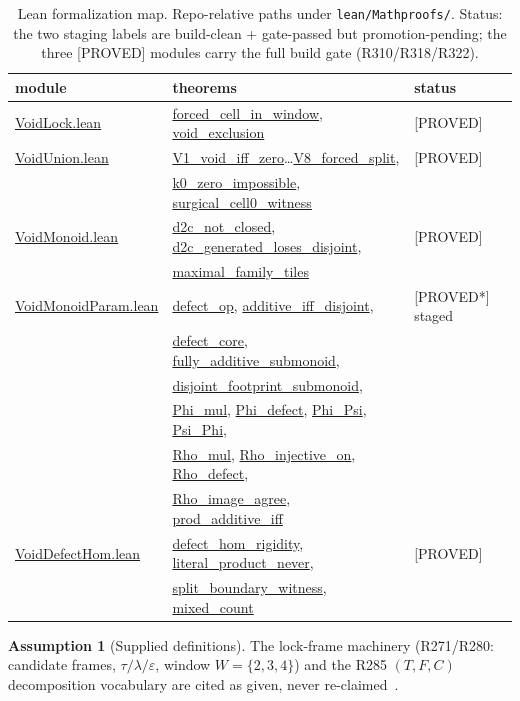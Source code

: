 \documentclass[11pt,a4paper]{article}
\theoremstyle{definition}
\newtheorem{assumption}{Assumption}
\begin{document}
\begin{table}[t]
  \centering
  \caption{Lean formalization map. Repo-relative paths under
    \texttt{lean/Mathproofs/}. Status: the two staging labels are
    build-clean + gate-passed but promotion-pending; the three
    [PROVED] modules carry the full build gate (R310/R318/R322).}
  \label{tab:formal}
  \begin{tabular}{lll}
    \toprule
    module & theorems & status \\
    \midrule
    \url{VoidLock.lean} &
    \url{forced_cell_in_window}, \url{void_exclusion} &
    [PROVED] \\
    \url{VoidUnion.lean} &
    \url{V1_void_iff_zero}\ldots\url{V8_forced_split}, &
    [PROVED] \\
    & \url{k0_zero_impossible}, \url{surgical_cell0_witness} & \\
    \url{VoidMonoid.lean} &
    \url{d2c_not_closed}, \url{d2c_generated_loses_disjoint}, &
    [PROVED] \\
    & \url{maximal_family_tiles} & \\
    \url{VoidMonoidParam.lean} &
    \url{defect_op}, \url{additive_iff_disjoint}, &
    [PROVED*] staged \\
    & \url{defect_core}, \url{fully_additive_submonoid}, & \\
    & \url{disjoint_footprint_submonoid}, & \\
    & \url{Phi_mul}, \url{Phi_defect}, \url{Phi_Psi},
      \url{Psi_Phi}, & \\
    & \url{Rho_mul}, \url{Rho_injective_on},
      \url{Rho_defect}, & \\
    & \url{Rho_image_agree}, \url{prod_additive_iff} & \\
    \url{VoidDefectHom.lean} &
    \url{defect_hom_rigidity}, \url{literal_product_never}, &
    [PROVED] \\
    & \url{split_boundary_witness}, \url{mixed_count} & \\
    \bottomrule
  \end{tabular}
\end{table}

\begin{assumption}[Supplied definitions]
  \label{asm:frames}
  The lock-frame machinery (R271/R280: candidate frames,
  $\tau/\lambda/\varepsilon$, window $W=\{2,3,4\}$) and the R285
  $(T,F,C)$ decomposition vocabulary are cited as given, never
  re-claimed~\cite{D283,D289}.
\end{assumption}
\end{document}
